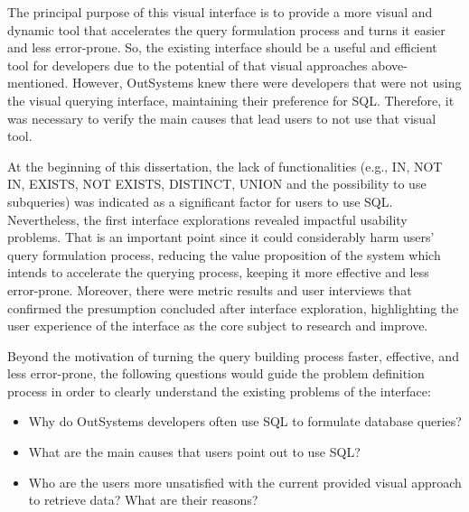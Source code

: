 The principal purpose of this visual interface is to provide a more visual and dynamic tool that accelerates the query formulation process and turns it easier and less error-prone. So, the existing interface should be a useful and efficient tool for developers due to the potential of that visual approaches above-mentioned. However, OutSystems knew there were developers that were not using the visual querying interface, maintaining their preference for SQL. Therefore, it was necessary to verify the main causes that lead users to not use that visual tool. 

At the beginning of this dissertation, the lack of functionalities (e.g., IN, NOT IN, EXISTS, NOT EXISTS, DISTINCT, UNION and the possibility to use subqueries) was indicated as a significant factor for users to use SQL. Nevertheless, the first interface explorations revealed impactful usability problems. That is an important point since it could considerably harm users' query formulation process, reducing the value proposition of the system which intends to accelerate the querying process, keeping it more effective and less error-prone. Moreover, there were metric results and user interviews that confirmed the presumption concluded after interface exploration, highlighting the user experience of the interface as the core subject to research and improve.

Beyond the motivation of turning the query building process faster, effective, and less error-prone, the following questions would guide the problem definition process in order to clearly understand the existing problems of the interface:

\begin{itemize}
  \item Why do OutSystems developers often use \gls{SQL} to formulate database queries?
  \item What are the main causes that users point out to use \gls{SQL}?
  \item Who are the users more unsatisfied with the current provided visual approach to retrieve data? What are their reasons?
\end{itemize}




